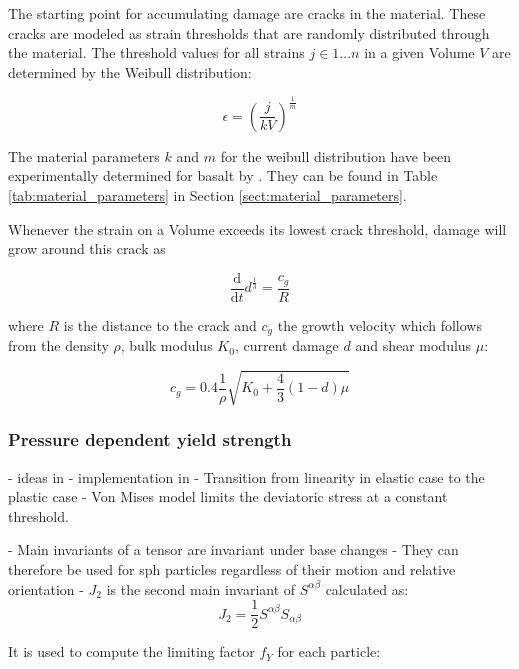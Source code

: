 The starting point for accumulating damage are cracks in the material. These cracks are modeled as strain thresholds that are randomly distributed through the material. The threshold values for all strains $j \in 1...n$ in a given Volume $V$ are determined by the Weibull distribution:

\begin{equation}
    \epsilon = \left(\frac{j}{kV}\right)^\frac{1}{m}
\end{equation}

The material parameters $k$ and $m$ for the weibull distribution have been experimentally determined for basalt by \cite{Nakamura_2007}. They can be found in Table \ref{tab:material_parameters} in Section \ref{sect:material_parameters}.

Whenever the strain on a Volume exceeds its lowest crack threshold, damage will grow around this crack as

\begin{equation}
    \frac{\mathrm{d}}{\mathrm{d}t} d^{\frac{1}{3}} = \frac{c_g}{R}
\end{equation}

where $R$ is the distance to the crack and $c_g$ the growth velocity which follows from the density $\rho$, bulk modulus $K_0$, current damage $d$ and shear modulus $\mu$:

\begin{equation}
    c_g = 0.4\frac{1}{\rho}\sqrt{K_0 + \frac{4}{3}(1-d)\mu}
\end{equation}

\subsubsection{Pressure dependent yield strength}
- ideas in \cite{Collins_2004}
- implementation in \cite{Jutzi_2015}
- Transition from linearity in elastic case to the plastic case
- Von Mises model limits the deviatoric stress at a constant threshold.

- Main invariants of a tensor are invariant under base changes
- They can therefore be used for sph particles regardless of their motion and relative orientation
- $J_2$ is the second main invariant of $S^{\alpha \beta}$ calculated as:
\begin{equation}
    J_2 = \frac{1}{2}S^{\alpha \beta}S_{\alpha \beta}
\end{equation}

It is used to compute the limiting factor $f_Y$ for each particle:

